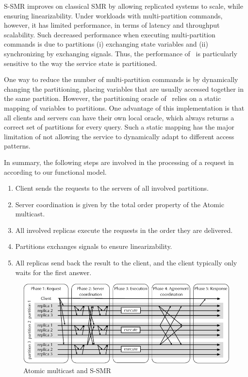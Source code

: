 S-SMR improves on classical SMR by allowing replicated systems to scale, while
ensuring linearizability. Under workloads with multi-partition commands,
however, it has limited performance, in terms of latency and throughput
scalability. Such decreased performance when executing multi-partition commands
is due to partitions (i) exchanging state variables and (ii) synchronizing by
exchanging signals. Thus, the performance of \ssmr\ is particularly
sensitive to the way the service state is partitioned.

One way to reduce the number of multi-partition commands is by dynamically
changing the partitioning, placing variables that are usually accessed together
in the same partition. However, the partitioning oracle of \ssmr\ relies on a
static mapping of variables to partitions. One advantage of this implementation
is that all clients and servers can have their own local oracle, which always
returns a correct set of partitions for every query. Such a static mapping has
the major limitation of not allowing the service to dynamically adapt to
different access patterns.

In summary, the following steps are involved in the processing of a request in
\ssmr\, according to our functional model.

\begin{enumerate}
  \item Client sends the requests to the servers of all involved partitions.
  \item Server coordination is given by the total order property of the Atomic
  multicast.
  \item All involved replicas execute the requests in the order they are delivered.
  \item Partitions exchanges signals to ensure linearizability.
  \item All replicas send back the result to the client, and the client
  typically only waits for the first answer.
\end{enumerate}

\begin{figure}
  \begin{minipage}[b]{1.0\linewidth}
  \centering
        \includegraphics[width=1\linewidth]{figures/coordination-ssmr}
  \end{minipage}
  \caption{Atomic multicast and S-SMR}
  \label{fig:coordination-ssmr}
\end{figure}

